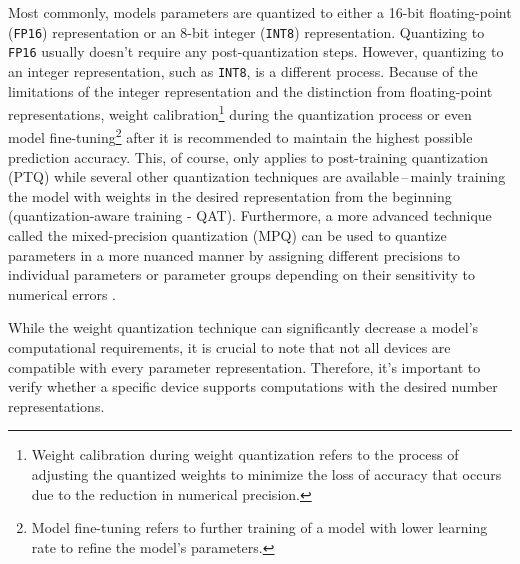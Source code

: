 Most commonly, models parameters are quantized to either a 16-bit floating-point
(\texttt{FP16}) representation or an 8-bit integer (\texttt{INT8})
representation. Quantizing to \texttt{FP16} usually doesn't require any
post-quantization steps. However, quantizing to an integer representation, such
as \texttt{INT8}, is a different process. Because of the limitations of the
integer representation and the distinction from floating-point representations,
weight calibration\footnote{Weight calibration during weight quantization refers
to the process of adjusting the quantized weights to minimize the loss of
accuracy that occurs due to the reduction in numerical precision.} during the
quantization process or even model fine-tuning\footnote{Model fine-tuning refers
to further training of a model with lower learning rate to refine the model's
parameters.} after it is recommended to maintain the highest possible prediction
accuracy. This, of course, only applies to post-training quantization (PTQ) while
several other quantization techniques are available\,--\,mainly training the
model with weights in the desired representation from the beginning (quantization-aware training - QAT).
Furthermore, a more advanced technique called the mixed-precision quantization
(MPQ) can be used to quantize parameters in a more nuanced manner by assigning
different precisions to individual parameters or parameter groups depending on
their sensitivity to numerical errors \cite{Tang2022}.

While the weight quantization technique can significantly decrease a model's
computational requirements, it is crucial to note that not all devices are
compatible with every parameter representation. Therefore, it's important to
verify whether a specific device supports computations with the desired number
representations.



